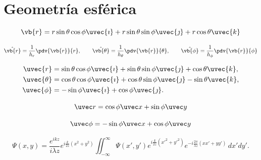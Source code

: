 \section{Geometría esférica}

\begin{equation*}
\vb{r} = r \sin\theta \cos\phi \uvec{\imath}
       + r \sin\theta \sin\phi \uvec{\jmath}
       + r \cos\theta \uvec{k}
\end{equation*}

\begin{equation*}
\hat{\vb{r}} = \frac{1}{h_r}\pdv{\vb{r}}{r}, \qquad
\hat{\vb{\theta}} = \frac{1}{h_\theta}\pdv{\vb{r}}{\theta}, \qquad
\hat{\vb{\phi}} = \frac{1}{h_\phi}\pdv{\vb{r}}{\phi}
\end{equation*}

\begin{align*}
\uvec{r} &= \sin\theta \cos\phi \uvec{\imath}
         + \sin\theta \sin\phi \uvec{\jmath}
         + \cos\theta \uvec{k}, \\
\uvec{\theta} &= \cos\theta \cos\phi \uvec{\imath}
              + \cos\theta \sin\phi \uvec{\jmath}
              - \sin\theta \uvec{k}, \\
\uvec{\phi} &= -\sin\phi \uvec{\imath}
             + \cos\phi \uvec{\jmath}.
\end{align*}

\begin{equation}
    \uvec r = \cos\phi \uvec x  + \sin\phi \uvec y 
    \label{eq:unit_r_def}
\end{equation}

\begin{equation}
    \uvec \phi = -\sin\phi \uvec x + \cos\phi \uvec y 
    \label{eq:unit_phi_def}
\end{equation}

\begin{equation}
    \Psi(x,y) = \frac{e^{ikz}}{i\lambda z} 
e^{i\frac{k}{2z}(x^2+y^2)} 
\iint_{-\infty}^{\infty} 
\Psi(x',y') e^{i\frac{k}{2z}(x'^2+y'^2)} 
e^{-i\frac{2\pi}{\lambda z}(xx' + yy')} 
\, dx' dy' .
    \label{eq:}
\end{equation}

